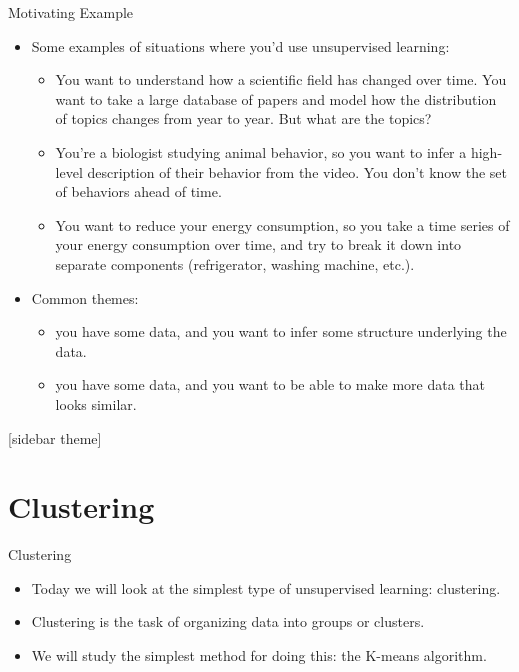 \documentclass[xcolor=dvipsnames, 9pt]{beamer} %
\begin{document}
\begin{frame}{Motivating Example}
\begin{itemize}
\item Some examples of situations where you’d use unsupervised learning:
\begin{itemize}
    \item You want to understand how a scientific field has changed over time. You want to take a large database of papers and model how the distribution of topics changes from year to year. But what are the topics?
    \item You’re a biologist studying animal behavior, so you want to infer a high-level description of their behavior from the video. You don’t know the set of behaviors ahead of time.
    \item You want to reduce your energy consumption, so you take a time series of your energy consumption over time, and try to break it down into separate components (refrigerator, washing machine, etc.).
\end{itemize}
\item Common themes:
\begin{itemize}
    \item you have some data, and you want to infer some structure underlying the data.
    \item you have some data, and you want to be able to make more data that looks similar.
\end{itemize}
\end{itemize}
\end{frame}

[sidebar theme]
\section{Clustering}

\begin{frame}{Clustering}
\begin{itemize}
    \item Today we will look at the simplest type of unsupervised learning: clustering.
    \item Clustering is the task of organizing data into groups or clusters.
    \item We will study the simplest method for doing this: the K-means algorithm.
\end{itemize}
\end{frame}
\end{document}
